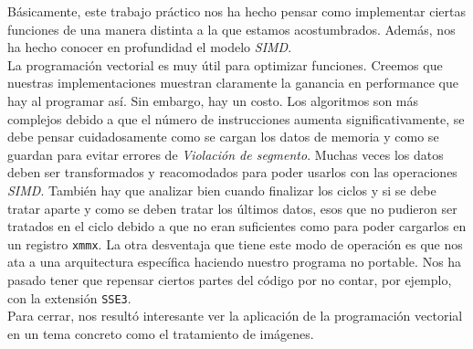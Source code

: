 \indent B\'asicamente, este trabajo pr\'actico nos ha hecho pensar como implementar ciertas funciones de una manera distinta a la que estamos acostumbrados. Adem\'as, nos ha hecho conocer en profundidad el modelo \textit{SIMD}.\\
\indent La programaci\'on vectorial es muy \'util para optimizar funciones. Creemos que nuestras implementaciones muestran claramente la ganancia en performance que hay al programar as\'i. Sin embargo, hay un costo. Los algoritmos son m\'as complejos debido a que el n\'umero de instrucciones aumenta significativamente, se debe pensar cuidadosamente como se cargan los datos de memoria y como se guardan para evitar errores de \textit{Violaci\'on de segmento}. Muchas veces los datos deben ser transformados y reacomodados para poder usarlos con las operaciones \textit{SIMD}.
Tambi\'en hay que analizar bien cuando finalizar los ciclos y si se debe tratar aparte y como se deben tratar los \'ultimos datos, esos que no pudieron ser tratados en el ciclo debido a que no eran suficientes como para poder cargarlos en un registro \texttt{xmmx}.
La otra desventaja que tiene este modo de operaci\'on es que nos ata a una arquitectura espec\'ifica haciendo nuestro programa no portable. Nos ha pasado tener que repensar ciertos partes del c\'odigo por no contar, por ejemplo, con la extensi\'on \texttt{SSE3}.\\
\indent Para cerrar, nos result\'o interesante ver la aplicaci\'on de la programaci\'on vectorial en un tema concreto como el tratamiento de im\'agenes.

